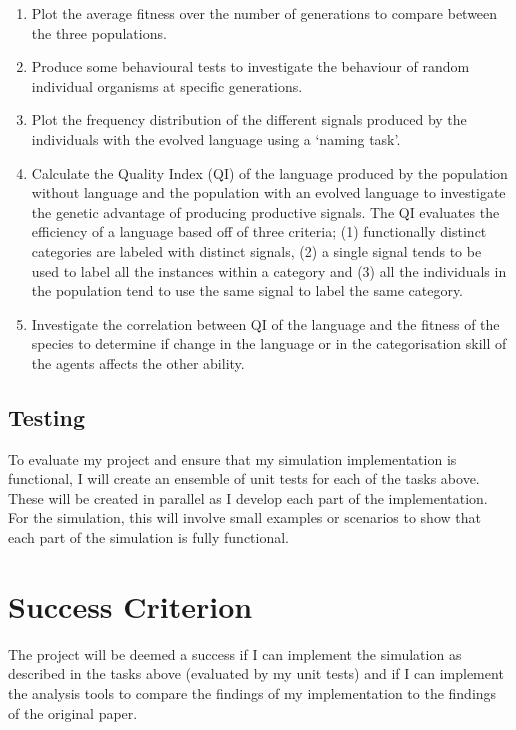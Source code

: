 \documentclass[12pt]{article}
\begin{document}
\begin{enumerate}

\item Plot the average fitness over the number of generations to compare between the three populations.

\item Produce some behavioural tests to investigate the behaviour of random individual organisms at specific generations.

\item Plot the frequency distribution of the different signals produced by the individuals with the evolved language using a `naming task'.

\item Calculate the Quality Index (QI) of the language produced by the population without language and the population with an evolved language to investigate the genetic advantage of producing productive signals. The QI evaluates the efficiency of a language based off of three criteria; (1) functionally distinct categories are labeled with distinct signals, (2) a single signal tends to be used to label all the instances within a category and (3) all the individuals in the population tend to use the same signal to label the same category.

\item Investigate the correlation between QI of the language and the fitness of the species to determine if change in the language or in the categorisation skill of the agents affects the other ability.

\end{enumerate}

\subsection*{Testing}

To evaluate my project and ensure that my simulation implementation is functional, I will create an ensemble of unit tests for each of the tasks above. These will be created in parallel as I develop each part of the implementation. For the simulation, this will involve small examples or scenarios to show that each part of the simulation is fully functional.

\section*{Success Criterion}

The project will be deemed a success if I can implement the simulation as described in the tasks above (evaluated by my unit tests) and if I can implement the analysis tools to compare the findings of my implementation to the findings of the original paper.
\end{document}
